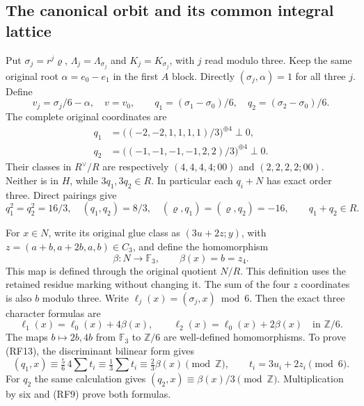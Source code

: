 \subsection{The canonical orbit and its common integral lattice}

Put $\sigma_j=r^j\varrho$, $\Lambda_j=\Lambda_{\sigma_j}$ and
$K_j=K_{\sigma_j}$, with $j$ read modulo three.
Keep the same original root
$\alpha=e_0-e_1$ in the first $A$ block.
Directly $(\sigma_j,\alpha)=1$ for all three $j$.
Define
\[
 v_j=\sigma_j/6-\alpha,\quad v=v_0,\qquad
 q_1=(\sigma_1-\sigma_0)/6,\quad
 q_2=(\sigma_2-\sigma_0)/6.
 \tag{RF9}
\]
The complete original coordinates are
\[
 \begin{split}
 q_1&=\bigl((-2,-2,1,1,1,1)/3\bigr)^{\oplus4}\perp0,\\
 q_2&=\bigl((-1,-1,-1,-1,2,2)/3\bigr)^{\oplus4}\perp0.
 \end{split}
 \tag{RF10}
\]
Their classes in $R^\vee/R$ are respectively
$(4,4,4,4;00)$ and $(2,2,2,2;00)$.
Neither is in $H$, while $3q_1,3q_2\in R$.
In particular each $q_i+N$ has exact order three.
Direct pairings give
\[
 q_1^2=q_2^2=16/3,\quad(q_1,q_2)=8/3,\quad
                    (\varrho,q_1)=(\varrho,q_2)=-16,
 \qquad q_1+q_2\in R.
 \tag{RF11}
\]

For $x\in N$, write its original glue class as $(3u+2z;y)$,
with $z=(a+b,a+2b,a,b)\in C_3$, and define the homomorphism
\[
 \beta:N\longrightarrow\mathbb F_3,\qquad\beta(x)=b=z_4.
 \tag{RF12}
\]
This map is defined through the original quotient $N/R$.
This definition uses the retained residue marking without changing it.
The sum of the four $z$ coordinates is also $b$ modulo three.
Write $\ell_j(x)=(\sigma_j,x)\bmod6$.
Then the exact three character formulas are
\[
 \ell_1(x)=\ell_0(x)+4\beta(x),\qquad
 \ell_2(x)=\ell_0(x)+2\beta(x)\quad\text{in }\mathbb Z/6.
 \tag{RF13}
\]
The maps $b\mapsto2b,4b$ from $\mathbb F_3$ to $\mathbb Z/6$
are well-defined homomorphisms.
To prove (RF13), the discriminant bilinear form gives
\[
 (q_1,x)\equiv\tfrac56\,4\sum t_i
       \equiv\tfrac13\sum t_i
       \equiv\tfrac23\beta(x)\pmod{\mathbb Z},
 \qquad t_i=3u_i+2z_i\pmod6.
\]
For $q_2$ the same calculation gives
$(q_2,x)\equiv\beta(x)/3\pmod{\mathbb Z}$.
Multiplication by six and (RF9) prove both formulas.

